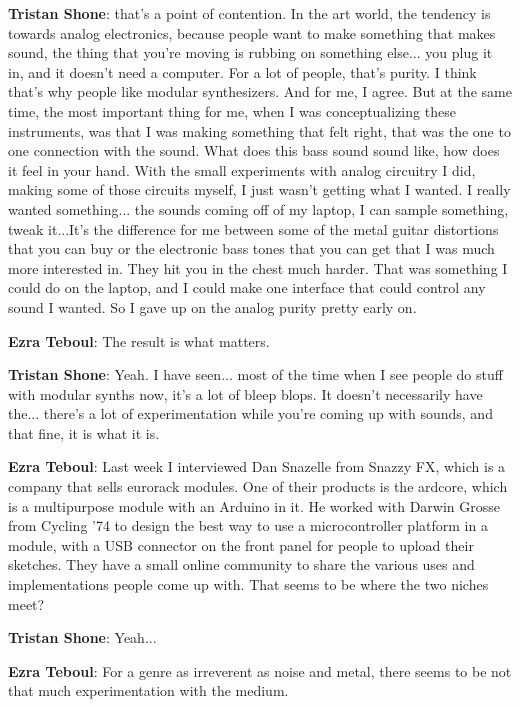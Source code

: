 \textbf{Tristan Shone}: that's a point of contention. In the art world, the tendency is towards analog electronics, because people want to make something that makes sound, the thing that you're moving is rubbing on something else... you plug it in, and it doesn't need a computer. For a lot of people, that's purity. I think that's why people like modular synthesizers. And for me, I agree. But at the same time, the most important thing for me, when I was conceptualizing these instruments, was that I was making something that felt right, that was the one to one connection with the sound. What does this bass sound sound like, how does it feel in your hand. With the small experiments with analog circuitry I did, making some of those circuits myself, I just wasn't getting what I wanted. I really wanted something... the sounds coming off of my laptop, I can sample something, tweak it...It's the difference for me between some of the metal guitar distortions that you can buy or the electronic bass tones that you can get that I was much more interested in. They hit you in the chest much harder. That was something I could do on the laptop, and I could make one interface that could control any sound I wanted. So I gave up on the analog purity pretty early on. 

\textbf{Ezra Teboul}: The result is what matters. 

\textbf{Tristan Shone}: Yeah. I have seen... most of the time when I see people do stuff with modular synths now, it's a lot of bleep blops. It doesn't necessarily have the... there's a lot of experimentation while you're coming up with sounds, and that fine, it is what it is. 

\textbf{Ezra Teboul}: Last week I interviewed Dan Snazelle from Snazzy FX, which is a company that sells eurorack modules. One of their products is the ardcore, which is a multipurpose module with an Arduino in it. He worked with Darwin Grosse from Cycling '74 to design the best way to use a microcontroller platform in a module, with a USB connector on the front panel for people to upload their sketches. They have a small online community to share the various uses and implementations people come up with. That seems to be where the two niches meet? 

\textbf{Tristan Shone}: Yeah... 

\textbf{Ezra Teboul}: For a genre as irreverent as noise and metal, there seems to be not that much experimentation with the medium. 

